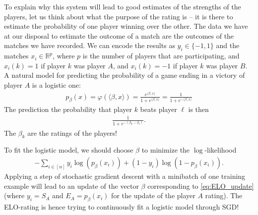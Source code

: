 \documentclass{article}
\newcommand{\sprod}[1]{\langle #1 \rangle}
\newcommand{\R}{\mathbb{R}}
\begin{document}
To explain why this system will lead to good estimates of the strengths of the players, let us think about what the purpose of the rating is -- it is there to estimate the probability of one player winning over the other. The data we have at our disposal to estimate the outcome of a match are the outcomes of the matches we have recorded. We can encode the results as $y_i \in \{-1,1\}$ and the matches $x_i \in \R^p$, where $p$ is the number of players that are participating, and $x_i(k)=1$ if player $k$ was player $A$, and $x_i(k)=-1$ if player $k$ was player $B$. A natural model for predicting the probability of a game ending in a victory of player $A$ is a logistic one:
\begin{align*}
    p_\beta(x) = \varphi(\sprod{\beta,x}) =  \frac{e^{\sprod{\beta,x}}}{1+e^{\sprod{\beta,x}}} = \frac{1}{1+e^{-\sprod{\beta,x}}}
\end{align*}
The prediction the probability that player $k$ beats player $\ell$ is then
\begin{align*}
    \frac{1}{1+e^{-(\beta_k-\beta_\ell)}}.
\end{align*}
The $\beta_k$ are the ratings of the players!

To fit the logistic model, we should choose $\beta$ to minimize the $\log$-likelihood
\begin{align*}
    -\sum_{i \in [n]} y_i \log(p_\beta(x_i)) + (1-y_i) \log(1-p_\beta(x_i)).
\end{align*}
Applying a step of stochastic gradient descent with a minibatch of one training example will lead to an update of the vector $\beta$ corresponding to \eqref{eq:ELO_update} (where $y_i=S_A$ and $E_A=p_\beta(x_i)$ for the update of the player $A$ rating). The ELO-rating is hence trying to continuously fit a logistic model through SGD!
\end{document}
